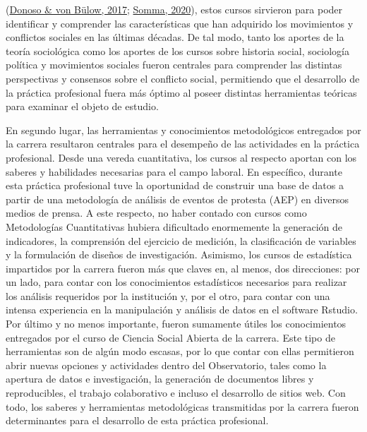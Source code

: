 \documentclass[
  12pt,
]{article}
\begin{document}
(\protect\hyperlink{ref-donosoSocialMovementsChile2017a}{Donoso \& von
Bülow, 2017};
\protect\hyperlink{ref-sommaSocialMovementsLatin2020}{Somma, 2020}),
estos cursos sirvieron para poder identificar y comprender las
características que han adquirido los movimientos y conflictos sociales
en las últimas décadas. De tal modo, tanto los aportes de la teoría
sociológica como los aportes de los cursos sobre historia social,
sociología política y movimientos sociales fueron centrales para
comprender las distintas perspectivas y consensos sobre el conflicto
social, permitiendo que el desarrollo de la práctica profesional fuera
más óptimo al poseer distintas herramientas teóricas para examinar el
objeto de estudio.

En segundo lugar, las herramientas y conocimientos metodológicos
entregados por la carrera resultaron centrales para el desempeño de las
actividades en la práctica profesional. Desde una vereda cuantitativa,
los cursos al respecto aportan con los saberes y habilidades necesarias
para el campo laboral. En específico, durante esta práctica profesional
tuve la oportunidad de construir una base de datos a partir de una
metodología de análisis de eventos de protesta (AEP) en diversos medios
de prensa. A este respecto, no haber contado con cursos como
Metodologías Cuantitativas hubiera dificultado enormemente la generación
de indicadores, la comprensión del ejercicio de medición, la
clasificación de variables y la formulación de diseños de investigación.
Asimismo, los cursos de estadística impartidos por la carrera fueron más
que claves en, al menos, dos direcciones: por un lado, para contar con
los conocimientos estadísticos necesarios para realizar los análisis
requeridos por la institución y, por el otro, para contar con una
intensa experiencia en la manipulación y análisis de datos en el
software Rstudio. Por último y no menos importante, fueron sumamente
útiles los conocimientos entregados por el curso de Ciencia Social
Abierta de la carrera. Este tipo de herramientas son de algún modo
escasas, por lo que contar con ellas permitieron abrir nuevas opciones y
actividades dentro del Observatorio, tales como la apertura de datos e
investigación, la generación de documentos libres y reproducibles, el
trabajo colaborativo e incluso el desarrollo de sitios web. Con todo,
los saberes y herramientas metodológicas transmitidas por la carrera
fueron determinantes para el desarrollo de esta práctica profesional.
\end{document}
